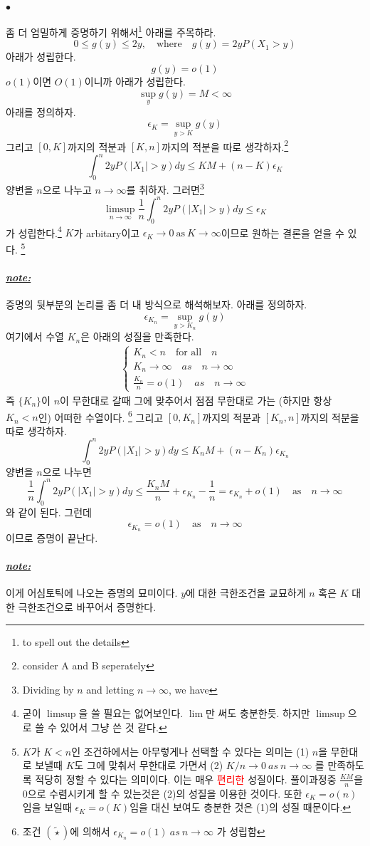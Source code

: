 \documentclass[12pt,oneside,english,a4paper]{article}
\def\ck{\paragraph{\Large$\bullet$}\Large}
\def\note{\paragraph{\Large\textit{\underline{note:}}}\Large}
\begin{document}
\ck 좀 더 엄밀하게 증명하기 위해서\footnote{to spell out the details} 아래를 주목하라. 
\[
0\leq g(y)\leq 2y, \quad \mbox{where} \quad g(y)=2yP(X_1>y)
\]
아래가 성립한다. 
\[
g(y)=o(1)
\]
$o(1)$이면 $O(1)$이니까 아래가 성립한다. 
\[
\sup_y g(y) =M <\infty
\]
아래를 정의하자. 
\[
\epsilon_K=\sup_{y > K} g(y)
\]
그리고 $[0,K]$까지의 적분과 $[K,n]$까지의 적분을 따로 생각하자.\footnote{consider A and B seperately}
\[
\int_0^{n}2yP(|X_1|>y)dy \leq KM +(n-K)\epsilon_K
\]
양변을 $n$으로 나누고 $n\to \infty$를 취하자. 그러면\footnote{Dividing by $n$ and letting $n\to\infty$, we have}
\[
\limsup_{n\to\infty}\frac{1}{n}\int_0^n2yP(|X_1|>y)dy\leq\epsilon_K
\]
가 성립한다.\footnote{굳이 $\limsup$을 쓸 필요는 없어보인다. $\lim$만 써도 충분한듯. 하지만 $\limsup$으로 쓸 수 있어서 그냥 쓴 것 같다.} $K$가 arbitary이고 $\epsilon_K \to 0 ~\mbox{as}~ K\to\infty$이므로 원하는 결론을 얻을 수 있다.
\footnote{$K$가 $K<n$인 조건하에서는 아무렇게나 선택할 수 있다는 의미는 (1) $n$을 무한대로 보낼때 $K$도 그에 맞춰서 무한대로 가면서 (2) $K/n \to 0 ~ as ~ n\to\infty$ 를 만족하도록 적당히 정할 수 있다는 의미이다. 이는 매우 \textcolor{red}{편리한} 성질이다. 풀이과정중 $\frac{KM}{n}$을 0으로 수렴시키게 할 수 있는것은 (2)의 성질을 이용한 것이다. 또한 $\epsilon_K=o(n)$임을 보일때 $\epsilon_K=o(K)$임을 대신 보여도 충분한 것은 (1)의 성질 때문이다.}

\note 증명의 뒷부분의 논리를 좀 더 내 방식으로 해석해보자. 아래를 정의하자. 
\[
\epsilon_{K_n}=\sup_{y>K_n}g(y)
\]
여기에서 수열 $K_n$은 아래의 성질을 만족한다. 
\begin{align*}
\begin{cases}
K_n < n \quad \mbox{for all} \quad n \\ 
K_n\to\infty \quad as \quad n\to\infty \\
\frac{K_n}{n}=o(1) \quad as \quad n\to\infty
\end{cases}
\end{align*}
즉 $\{K_n\}$이 $n$이 무한대로 갈때 그에 맞추어서 점점 무한대로 가는 (하지만 항상 $K_n<n$인) 어떠한 수열이다. \footnote{조건 $(\tilde\star)$에 의해서 $\epsilon_{K_n}=o(1)~ as~ n\to\infty$ 가 성립함} 
그리고 $[0,K_n]$까지의 적분과 $[K_n,n]$까지의 적분을 따로 생각하자. 
\[
\int_0^{n}2yP(|X_1|>y)dy \leq K_nM +(n-K_n)\epsilon_{K_n}
\]
양변을 $n$으로 나누면 
\[
\frac{1}{n}\int_0^n2yP(|X_1|>y)dy\leq\frac{K_nM}{n}+\epsilon_{K_n}-\frac{1}{n}=\epsilon_{K_n}+o(1) \quad \mbox{as}\quad n\to\infty
\]
와 같이 된다. 그런데 
\[
\epsilon_{K_n}=o(1) \quad \mbox{as}\quad n\to\infty 
\]
이므로 증명이 끝난다. 

\note 이게 어심토틱에 나오는 증명의 묘미이다. $y$에 대한 극한조건을 교묘하게 $n$ 혹은 $K$ 대한 극한조건으로 바꾸어서 증명한다. 
\end{document}
